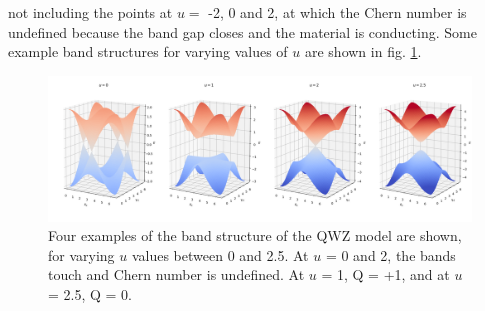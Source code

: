 not including the points at $u =$ -2, 0 and 2, at which the Chern number is undefined because the band gap closes and the material is conducting. Some example band structures for varying values of $u$ are shown in fig. \ref{fig:QWZ_band_struct}.
\begin{figure}[t]
\begin{center}
 \includegraphics[width=\textwidth]{QWZ_band_struct}
\caption{Four examples of the band structure of the QWZ model are shown, for varying $u$ values between 0 and 2.5. At $u$ = 0 and 2, the bands touch and Chern number is undefined. At $u$ = 1, Q = +1, and at $u$ = 2.5, Q = 0.}
\label{fig:QWZ_band_struct}
\end{center}
\end{figure}

